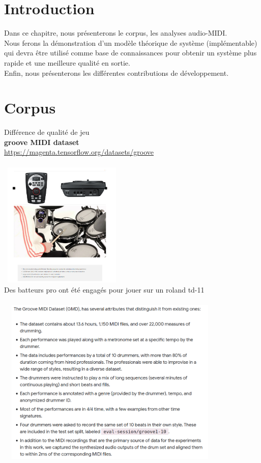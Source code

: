 \section*{Introduction}
Dans ce chapitre, nous présenterons le corpus, les analyses audio-MIDI.\\
Nous ferons la démonstration d’un modèle théorique de système (implémentable) qui devra être utilisé comme base de connaissances pour obtenir un système plus rapide et une meilleure qualité en sortie.\\
Enfin, nous présenterons les différentes contributions de développement.
\section{Corpus}
Différence de qualité de jeu\\
\textbf{groove MIDI dataset}\\
\url{https://magenta.tensorflow.org/datasets/groove}\\\\
\includegraphics[height=60mm, width=60mm]{z_images/3_groove/roland_TD11.png}\\
Des batteurs pro ont été engagés pour jouer sur un roland td-11\\\\
\includegraphics[height=80mm, width=110mm]{z_images/3_groove/dataset_how.png}\newpage{}
